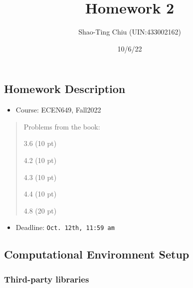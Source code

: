 \documentclass[
  letterpaper,
  DIV=11,
  numbers=noendperiod]{scrartcl}
\title{Homework 2}
\author{Shao-Ting Chiu (UIN:433002162)}
\date{10/6/22}
\providecommand{\tightlist}{%
  \setlength{\itemsep}{0pt}\setlength{\parskip}{0pt}}\usepackage{longtable,booktabs,array}
\renewcommand*\contentsname{Table of contents}
\newcommand\contentsname{Table of contents}
\begin{document}
\maketitle
\ifdefined\Shaded\renewenvironment{Shaded}{\begin{tcolorbox}[frame hidden, boxrule=0pt, borderline west={3pt}{0pt}{shadecolor}, interior hidden, enhanced, breakable, sharp corners]}{\end{tcolorbox}}\fi

\renewcommand*\contentsname{Table of contents}
{
\hypersetup{linkcolor=}
\setcounter{tocdepth}{3}
\tableofcontents
}
\hypertarget{homework-description}{%
\subsection{Homework Description}\label{homework-description}}

\begin{itemize}
\tightlist
\item
  Course: ECEN649, Fall2022
\end{itemize}

\begin{quote}
Problems from the book:

3.6 (10 pt)

4.2 (10 pt)

4.3 (10 pt)

4.4 (10 pt)

4.8 (20 pt)
\end{quote}

\begin{itemize}
\tightlist
\item
  Deadline: \texttt{Oct.\ 12th,\ 11:59\ am}
\end{itemize}

\hypertarget{computational-enviromnent-setup}{%
\subsection{Computational Enviromnent
Setup}\label{computational-enviromnent-setup}}

\hypertarget{third-party-libraries}{%
\subsubsection{Third-party libraries}\label{third-party-libraries}}
\end{document}
